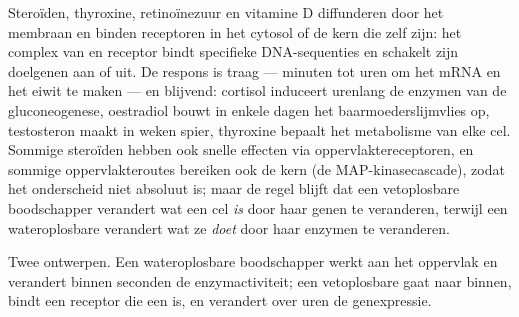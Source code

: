 \begin{proposition}[Kernreceptoren]\label{prop:b2:cell-signalling:nuclear}
Steroïden, thyroxine, retinoïnezuur en vitamine D diffunderen door het
membraan en binden receptoren in het cytosol of de kern die zelf
\emph{} zijn: het complex van  en receptor bindt
specifieke DNA-sequenties en schakelt zijn doelgenen aan of uit. De respons
is traag --- minuten tot uren om het mRNA en het eiwit te maken --- en
blijvend: cortisol induceert urenlang de enzymen van de gluconeogenese,
oestradiol bouwt in enkele dagen het baarmoederslijmvlies op, testosteron
maakt in weken spier, thyroxine bepaalt het metabolisme van elke cel. Sommige
steroïden hebben ook snelle effecten via oppervlaktereceptoren, en sommige
oppervlakteroutes bereiken ook de kern (de MAP-kinasecascade), zodat het
onderscheid niet absoluut is; maar de regel blijft dat een vetoplosbare
boodschapper verandert wat een cel \emph{is} door haar genen te veranderen,
terwijl een wateroplosbare verandert wat ze \emph{doet} door haar enzymen te
veranderen.
\end{proposition}

\begin{omfigure}

{\small Twee ontwerpen. Een wateroplosbare boodschapper werkt aan het
oppervlak en verandert binnen seconden de enzymactiviteit; een vetoplosbare
gaat naar binnen, bindt een receptor die een  is, en
verandert over uren de genexpressie.}
\end{omfigure}

